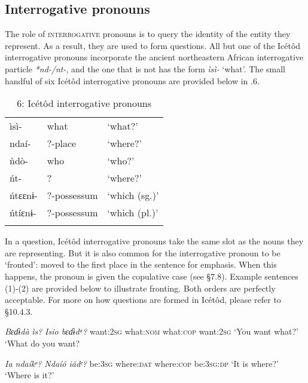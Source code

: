 \subsection{Interrogative pronouns}


The role of \textsc{interrogative }pronouns is to query the identity of the entity they represent. As a result, they are used to form questions. All but one of the Icétôd interrogative pronouns incorporate the ancient northeastern African interrogative particle \textit{*nd-/nt-}, and the one that is not has the form \textit{ìsì- }‘what’. The small handful of six Icétôd interrogative pronouns are provided below in .6. 


\begin{table}
\caption{6: Icétôd interrogative pronouns}
\label{tab:5}


\begin{tabularx}{\textwidth}{XXX}
\lsptoprule

ìsì- & what & ‘what?’\\
ndaí- & ?-place & ‘where?’\\
ǹdò- & who & ‘who?’\\
ńt- & ? & ‘where?’\\
ńtɛɛnɨ- & ?-possessum & ‘which (sg.)’\\
ńtíɛnɨ- & ?-possessum & ‘which (pl.)’\\
\lspbottomrule
\end{tabularx}
\end{table}
In a question, Icétôd interrogative pronouns take the same slot as the nouns they are representing. But it is also common for the interrogative pronoun to be ‘fronted’: moved to the first place in the sentence for emphasis. When this happens, the pronoun is given the copulative case (see §7.8). Example sentences (1)-(2) are provided below to illustrate fronting. Both orders are perfectly acceptable. For more on how questions are formed in Icétôd, please refer to §10.4.3.




\textit{Bɛɗɨdà   }\textit{ìs}\textit{?      }\textit{Isi}\textit{o     bɛɗɨdᵃ?}
want:\textsc{2sg}   what:\textsc{nom}    what:\textsc{cop}   want:2\textsc{sg}
‘You want what?’      ‘What do you want?




\textit{Ia     ndaíkᵉ?    Ndaíó   iâdᵉ?}
be:\textsc{3sg}   where:\textsc{dat}    where:\textsc{cop}   be:\textsc{3sg:dp}
‘It is where?’      ‘Where is it?’






